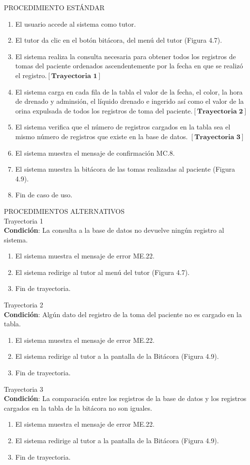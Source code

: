 \Large{PROCEDIMIENTO ESTÁNDAR}
\large{}
\begin{enumerate}
\item El usuario accede al sistema como tutor.
		\item El tutor da clic en el botón bitácora, del menú del tutor (Figura 4.7).
		\item El sistema realiza la consulta necesaria para obtener todos los registros de tomas del paciente ordenados ascendentemente por la fecha en que se realizó el registro.$\left[\textbf{Trayectoria 1}\right]$
		\item El sistema carga en cada fila de la tabla el valor de la fecha, el color, la hora de drenado y adminsión, el líquido drenado e ingerido así como el valor de la orina expulsada de todos los registros de toma del paciente.$\left[\textbf{Trayectoria 2}\right]$
		\item El sistema verifica que el número de registros cargados en la tabla sea el mismo número de registros que existe en la base de datos. $\left[\textbf{Trayectoria 3}\right]$
		\item El sistema muestra el mensaje de confirmación MC.8.
		\item El sistema muestra la bitácora de las tomas realizadas al paciente (Figura 4.9).
		\item Fin de caso de uso.
\end{enumerate}
\vspace*{1cm}
\Large{PROCEDIMIENTOS ALTERNATIVOS}\\
\large{Trayectoria 1}\\
\textbf{Condición}: La consulta a la base de datos no devuelve ningún registro al sistema.
\begin{enumerate}
		\item El sistema muestra el mensaje de error ME.22.
		\item El sistema redirige al tutor al menú del tutor (Figura 4.7).
		\item Fin de trayectoria.
\end{enumerate}
\large{Trayectoria 2}\\
\textbf{Condición}: Algún dato del registro de la toma del paciente no es cargado en la tabla.
\begin{enumerate}
		\item El sistema muestra el mensaje de error ME.22.
		\item El sistema redirige al tutor a la pantalla de la Bitácora (Figura 4.9).
		\item Fin de trayectoria.
\end{enumerate}
\large{Trayectoria 3}\\
\textbf{Condición}: La comparación entre los registros de la base de datos y los registros cargados en la tabla de la bitácora no son iguales.
\begin{enumerate}
		\item El sistema muestra el mensaje de error ME.22.
		\item El sistema redirige al tutor a la pantalla de la Bitácora (Figura 4.9).
		\item Fin de trayectoria.
\end{enumerate}
\newpage
